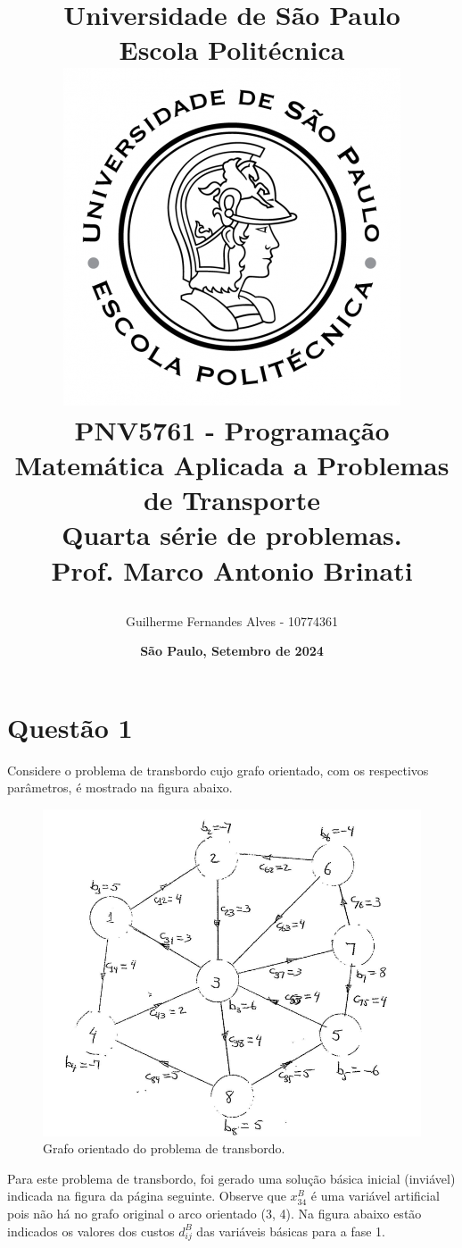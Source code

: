 \documentclass{article}
\title{
    \textbf{Universidade de São Paulo\\ Escola Politécnica}\\
    \vspace{20pt}
    \includegraphics[scale=0.5]{images/logo-poli.png} \\
    \vspace{20pt}
    \textbf{PNV5761 - Programação Matemática Aplicada a Problemas de Transporte} \\
    \vspace{10pt}
    \textbf{Quarta série de problemas.}\\
    \vspace{15pt}
    \large{Prof. Marco Antonio Brinati} \\
    \vspace{45pt}
    \vspace{10pt}
    \date{\textbf{\Large{São Paulo, Setembro de 2024}}}
}
\author{Guilherme Fernandes Alves - 10774361}
\begin{document}
\renewcommand{\arraystretch}{1.5}

\maketitle
\newpage

\section{Questão 1}

Considere o problema de transbordo cujo grafo orientado, com os respectivos parâmetros, é mostrado na figura abaixo.

\begin{figure}[H]
    \centering
    \includegraphics[scale=0.7]{images/q1-enunciado.png}
    \caption{Grafo orientado do problema de transbordo.}
\end{figure}

Para este problema de transbordo, foi gerado uma solução básica inicial (inviável) indicada na figura da página seguinte.
Observe que $x^{B}_{34}$ é uma variável artificial pois não há no grafo original o arco orientado (3, 4).
Na figura abaixo estão indicados os valores dos custos $d_{ij}^{B}$ das variáveis básicas para a fase 1.
\end{document}
